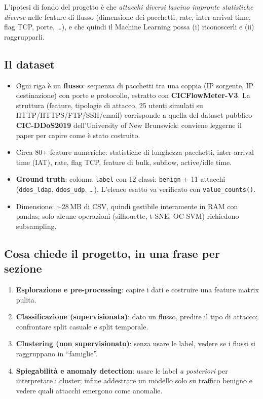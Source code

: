 L'ipotesi di fondo del progetto è che \emph{attacchi diversi lascino impronte
statistiche diverse} nelle feature di flusso (dimensione dei pacchetti, rate,
inter-arrival time, flag TCP, porte, \dots), e che quindi il Machine Learning
possa (i) riconoscerli e (ii) raggrupparli.

\subsection{Il dataset}
\begin{itemize}
  \item Ogni riga è un \textbf{flusso}: sequenza di pacchetti tra una coppia
        (IP sorgente, IP destinazione) con porte e protocollo, estratto con
        \textbf{CICFlowMeter-V3}. La struttura (feature, tipologie di
        attacco, 25 utenti simulati su HTTP/HTTPS/FTP/SSH/email) corrisponde a
        quella del dataset pubblico \textbf{CIC-DDoS2019} dell'University of New
        Brunswick: conviene leggerne il paper per capire come è stato costruito.
  \item Circa 80+ feature numeriche: statistiche di lunghezza pacchetti,
        inter-arrival time (IAT), rate, flag TCP, feature di bulk, subflow,
        active/idle time.
  \item \textbf{Ground truth}: colonna \texttt{label} con 12 classi:
        \texttt{benign} + 11 attacchi (\texttt{ddos\_ldap}, \texttt{ddos\_udp},
        \dots). L'elenco esatto va verificato con \texttt{value\_counts()}.
  \item Dimensione: $\sim$28\,MB di CSV, quindi gestibile interamente in RAM con
        pandas; solo alcune operazioni (silhouette, t-SNE, OC-SVM) richiedono
        subsampling.
\end{itemize}

\subsection{Cosa chiede il progetto, in una frase per sezione}
\begin{enumerate}
  \item \textbf{Esplorazione e pre-processing}: capire i dati e costruire una
        feature matrix pulita.
  \item \textbf{Classificazione (supervisionata)}: dato un flusso, predire il
        tipo di attacco; confrontare split casuale e split temporale.
  \item \textbf{Clustering (non supervisionato)}: senza usare le label, vedere se
        i flussi si raggruppano in ``famiglie''.
  \item \textbf{Spiegabilità e anomaly detection}: usare le label \emph{a
        posteriori} per interpretare i cluster; infine addestrare un modello
        solo su traffico benigno e vedere quali attacchi emergono come anomalie.
\end{enumerate}

